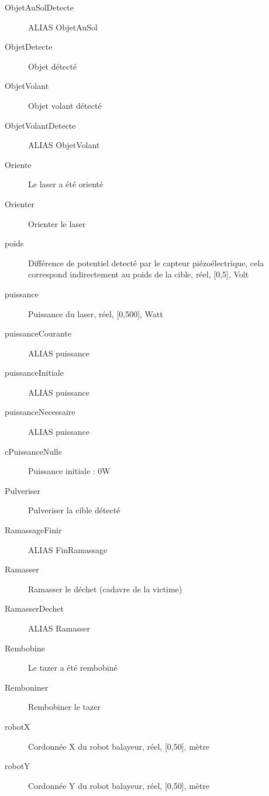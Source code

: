 \begin{description}
	\item [ObjetAuSolDetecte]\el
	ALIAS ObjetAuSol

	\item [ObjetDetecte]\el
	Objet détecté

	\item [ObjetVolant]\el
	Objet volant détecté

	\item [ObjetVolantDetecte]\el
	ALIAS ObjetVolant

	\item [Oriente]\el
	Le laser a été orienté

	\item [Orienter]\el
	Orienter le laser

	\item [poids]\el
	Différence de potentiel detecté par le capteur piézoélectrique, cela correspond indirectement au poids de la cible, réel, [0,5], Volt

	\item [puissance]\el
	Puissance du laser, réel, [0,500], Watt

	\item [puissanceCourante]\el
	ALIAS puissance

	\item [puissanceInitiale]\el
	ALIAS puissance

	\item [puissanceNecessaire]\el
	ALIAS puissance

	\item [cPuissanceNulle]\el
	Puissance initiale : 0W

	\item [Pulveriser]\el
	Pulveriser la cible détecté

	\item [RamassageFinir]\el
	ALIAS FinRamassage

	\item [Ramasser]\el
	Ramasser le déchet (cadavre de la victime)

	\item [RamasserDechet]\el
	ALIAS Ramasser

	\item [Rembobine]\el
	Le tazer a été rembobiné

	\item [Remboniner]\el
	Rembobiner le tazer

	\item [robotX]\el
	Cordonnée X du robot balayeur, réel, [0,50], mètre

	\item [robotY]\el
	Cordonnée Y du robot balayeur, réel, [0,50], mètre


\end{description}
